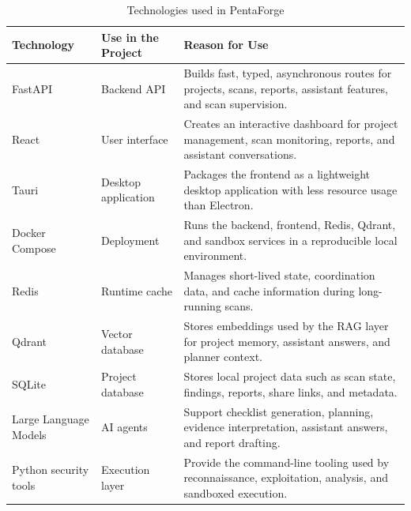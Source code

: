 \begin{table}[H]
    \centering
    \caption{Technologies used in PentaForge}
    \label{tab:technologies_used}
    \renewcommand{\arraystretch}{1.35}
    \begin{tabular}{|p{}|p{}|p{}|}
        \hline
        \textbf{Technology} & \textbf{Use in the Project} & \textbf{Reason for Use} \\
        \hline
        FastAPI & Backend API & Builds fast, typed, asynchronous routes for projects,
        scans, reports, assistant features, and scan supervision. \\
        \hline
        React & User interface & Creates an interactive dashboard for project
        management, scan monitoring, reports, and assistant conversations. \\
        \hline
        Tauri & Desktop application & Packages the frontend as a lightweight desktop
        application with less resource usage than Electron. \\
        \hline
        Docker Compose & Deployment & Runs the backend, frontend, Redis, Qdrant, and
        sandbox services in a reproducible local environment. \\
        \hline
        Redis & Runtime cache & Manages short-lived state, coordination data, and
        cache information during long-running scans. \\
        \hline
        Qdrant & Vector database & Stores embeddings used by the RAG layer for
        project memory, assistant answers, and planner context. \\
        \hline
        SQLite & Project database & Stores local project data such as scan state,
        findings, reports, share links, and metadata. \\
        \hline
        Large Language Models & AI agents & Support checklist generation, planning,
        evidence interpretation, assistant answers, and report drafting. \\
        \hline
        Python security tools & Execution layer & Provide the command-line tooling
        used by reconnaissance, exploitation, analysis, and sandboxed execution. \\
        \hline
    \end{tabular}
\end{table}
